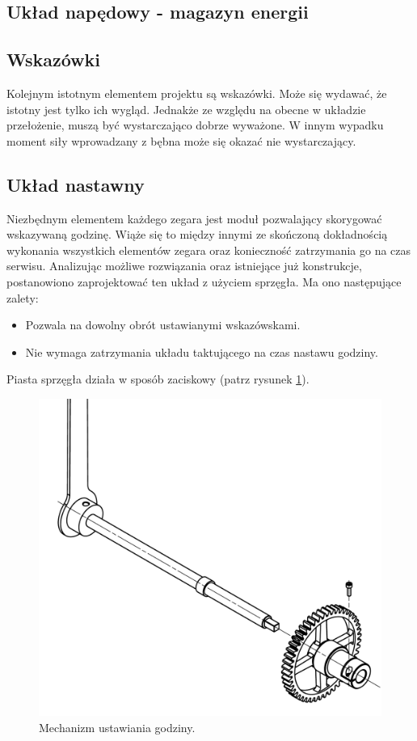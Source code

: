         \subsection{Układ napędowy - magazyn energii}
        	
        \subsection{Wskazówki}
        Kolejnym istotnym elementem projektu są wskazówki.
        Może się wydawać, że istotny jest tylko ich wygląd.
        Jednakże ze względu na obecne w układzie przełożenie, muszą być wystarczająco dobrze wyważone.
        W innym wypadku moment siły wprowadzany z bębna może się okazać nie wystarczający.
        
        \subsection{Układ nastawny}
        Niezbędnym elementem każdego zegara jest moduł pozwalający skorygować wskazywaną godzinę.
        Wiąże się to między innymi ze skończoną dokładnością wykonania wszystkich elementów zegara oraz konieczność zatrzymania go na czas serwisu.
        Analizując możliwe rozwiązania oraz istniejące już konstrukcje, postanowiono zaprojektować ten układ z użyciem sprzęgła.
        Ma ono następujące zalety:
        \begin{itemize}
        	\item Pozwala na dowolny obrót ustawianymi wskazówskami.
        	\item Nie wymaga zatrzymania układu taktującego na czas nastawu godziny.
        \end{itemize}
		Piasta sprzęgła działa w sposób zaciskowy (patrz rysunek \ref{fig:szpeglo}).
		
		\begin{figure}
			\centering
			\includegraphics[width=0.8\linewidth]{Projekt/szpeglo}
			\caption{Mechanizm ustawiania godziny.}
			\label{fig:szpeglo}
		\end{figure}
		

